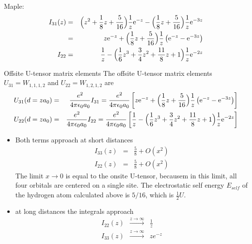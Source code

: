 \documentclass[11pt,a4paper]{report}
\begin{document}
Maple:
\begin{eqnarray}
I_{31}(z)
&=&
\Bigl(z^2+\frac{1}{8}z+\frac{5}{16}\Bigr)\frac{1}{z}\mathrm{e}^{-z}
-\Bigl(\frac{1}{8}z+\frac{5}{16}\Bigr)\frac{1}{z}\mathrm{e}^{-3z}
\nonumber\\
&=&
z\mathrm{e}^{-z}+
\Bigl(\frac{1}{8}z+\frac{5}{16}\Bigr)\frac{1}{z}\left(\mathrm{e}^{-z}-\mathrm{e}^{-3z}\right)
\nonumber\\
I_{22}
&=&
\frac{1}{z}-\Bigl(\frac{1}{6}z^3
+\frac{3}{4}z^2+\frac{11}{8}z+1\Bigr)\frac{1}{z}\mathrm{e}^{-2z}
\end{eqnarray}



\begin{myshadowminipage}{Offsite U-tensor matrix elements}
The offsite U-tensor matrix elements $U_{31}=W_{1,1,1,2}$ and
$U_{22}=W_{1,2,1,2}$ are
\begin{eqnarray}
U_{31}(d=za_0)
&=&\frac{e^2}{4\pi\epsilon_0a_0}I_{31}
=\frac{e^2}{4\pi\epsilon_0a_0}
\left[
z\mathrm{e}^{-z}+
\Bigl(\frac{1}{8}z+\frac{5}{16}\Bigr)\frac{1}{z}\left(\mathrm{e}^{-z}-\mathrm{e}^{-3z}\right)
\right]
\nonumber\\
U_{22}(d=za_0)
&=&\frac{e^2}{4\pi\epsilon_0a_0}I_{22}
=\frac{e^2}{4\pi\epsilon_0a_0}
\left[\frac{1}{z}-\Bigl(\frac{1}{6}z^3+\frac{3}{4}z^2
+\frac{11}{8}z+1\Bigr)\frac{1}{z}\mathrm{e}^{-2z}
\right]
\end{eqnarray}
\end{myshadowminipage}

\begin{itemize}
\item Both terms approach at short distances 
\begin{eqnarray}
I_{33}(z)&=&\frac{5}{8}+O(x^2)
\nonumber\\
I_{22}(z)&=&\frac{5}{8}+O(x^2)
\end{eqnarray}
The limit $x\rightarrow0$ is equal to the onsite U-tensor, becausem in
this limit, all four orbitals are centered on a single site. The
electrostatic self energy $E_{self}$ of the hydrogen atom calculated
above is $5/16$, which is $\frac{1}{2}U$.
%
\item at long distances the integrals approach
\begin{eqnarray}
I_{22}(z)&\stackrel{z\rightarrow\infty}{\rightarrow}&\frac{1}{z}
\nonumber\\
I_{33}(z)&\stackrel{z\rightarrow\infty}{\rightarrow}&ze^{-z}
\end{eqnarray}
\end{itemize}
\end{document}
